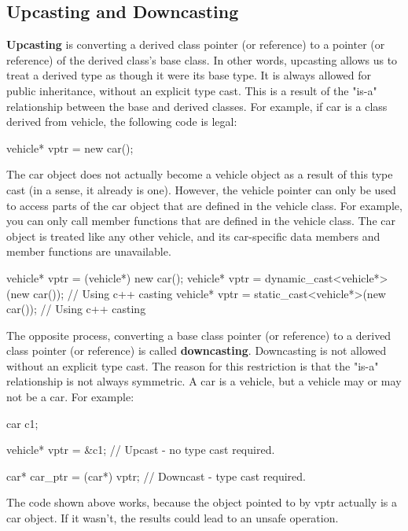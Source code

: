\documentclass{report}
\begin{document}
    \subsection{Upcasting and Downcasting}
    \bigbreak \noindent 
    \textbf{Upcasting} is converting a derived class pointer (or reference) to a pointer (or reference) of the derived class's base class. In other words, upcasting allows us to treat a derived type as though it were its base type. It is always allowed for public inheritance, without an explicit type cast. This is a result of the "is-a" relationship between the base and derived classes. For example, if car is a class derived from vehicle, the following code is legal:
    \bigbreak \noindent 
    \begin{cppcode}
        vehicle* vptr = new car();
    \end{cppcode}
    \bigbreak \noindent 
    The car object does not actually become a vehicle object as a result of this type cast (in a sense, it already is one). However, the vehicle pointer can only be used to access parts of the car object that are defined in the vehicle class. For example, you can only call member functions that are defined in the vehicle class. The car object is treated like any other vehicle, and its car-specific data members and member functions are unavailable.
    \bigbreak \noindent 
    \begin{cppcode}
        vehicle* vptr = (vehicle*) new car();
        vehicle* vptr = dynamic_cast<vehicle*>(new car()); // Using c++ casting
        vehicle* vptr = static_cast<vehicle*>(new car()); // Using c++ casting
    \end{cppcode}
    \bigbreak \noindent 
    The opposite process, converting a base class pointer (or reference) to a derived class pointer (or reference) is called \textbf{downcasting}. Downcasting is not allowed without an explicit type cast. The reason for this restriction is that the "is-a" relationship is not always symmetric. A car is a vehicle, but a vehicle may or may not be a car. For example:
    \bigbreak \noindent 
    \begin{cppcode}
        car c1;

        vehicle* vptr = &c1;          // Upcast - no type cast required.

        car* car_ptr = (car*) vptr;   // Downcast - type cast required.
    \end{cppcode}
    \bigbreak \noindent 
    The code shown above works, because the object pointed to by vptr actually is a car object. If it wasn't, the results could lead to an unsafe operation.
\end{document}
